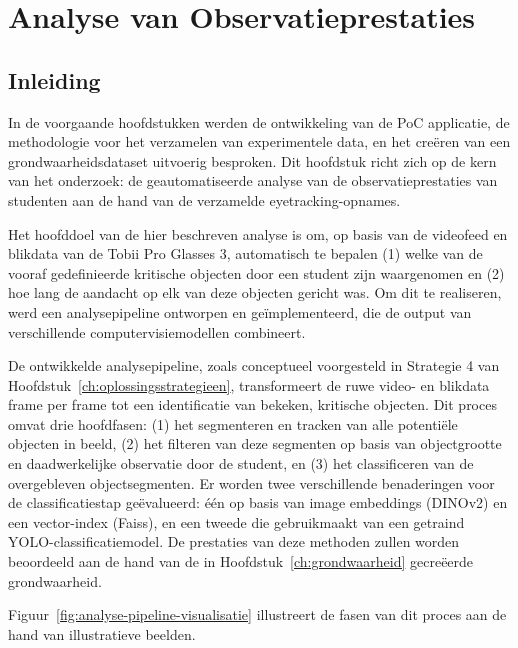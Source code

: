 \chapter{Analyse van Observatieprestaties}
\label{ch:analyse}

\section{Inleiding}

In de voorgaande hoofdstukken werden de ontwikkeling van de PoC applicatie, de methodologie voor het verzamelen 
van experimentele data, en het creëren van een grondwaarheidsdataset uitvoerig besproken. 
Dit hoofdstuk richt zich op de kern van het onderzoek: de geautomatiseerde analyse van de 
observatieprestaties van studenten aan de hand van de verzamelde eyetracking-opnames.

Het hoofddoel van de hier beschreven analyse is om, op basis van de videofeed en blikdata van de Tobii Pro Glasses 3, 
automatisch te bepalen (1) welke van de vooraf gedefinieerde kritische objecten door een student zijn waargenomen en (2) 
hoe lang de aandacht op elk van deze objecten gericht was. 
Om dit te realiseren, werd een analysepipeline ontworpen en geïmplementeerd, die de output van verschillende computervisiemodellen combineert.

De ontwikkelde analysepipeline, zoals conceptueel voorgesteld in Strategie 4 van Hoofdstuk~\ref{ch:oplossingsstrategieen}, 
transformeert de ruwe video- en blikdata frame per frame tot een identificatie van bekeken, kritische objecten. 
Dit proces omvat drie hoofdfasen: (1) het segmenteren en tracken van alle potentiële objecten in beeld, 
(2) het filteren van deze segmenten op basis van objectgrootte en daadwerkelijke observatie door de student, en 
(3) het classificeren van de overgebleven objectsegmenten. 
Er worden twee verschillende benaderingen voor de classificatiestap geëvalueerd: één op basis van image embeddings (DINOv2) en een vector-index (Faiss), 
en een tweede die gebruikmaakt van een getraind YOLO-classificatiemodel. 
De prestaties van deze methoden zullen worden beoordeeld aan de hand van de in Hoofdstuk~\ref{ch:grondwaarheid} gecreëerde grondwaarheid.

Figuur~\ref{fig:analyse-pipeline-visualisatie} illustreert de fasen van dit proces aan de hand van illustratieve beelden.

